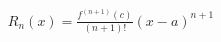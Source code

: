 \documentclass[preview]{standalone}
\begin{document}
\begin{align*}
R_n(x) = \frac{f^{(n+1)}(c)}{(n+1)!}(x-a)^{n+1}
\end{align*}
\end{document}
